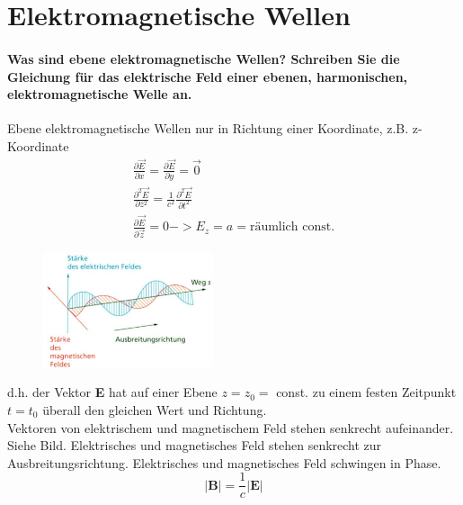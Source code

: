 \documentclass[a4paper, 11pt, parskip=half]{scrartcl}
\begin{document}
\newpage

\section{Elektromagnetische Wellen}

\paragraph{Was sind ebene elektromagnetische Wellen? Schreiben Sie die Gleichung für das elektrische
Feld einer ebenen, harmonischen, elektromagnetische Welle an.} 
Ebene elektromagnetische Wellen nur in Richtung einer Koordinate, z.B. z- Koordinate
\begin{equation}
\begin{split}
\frac{\partial \vec{E}}{\partial x} = \frac{\partial \vec{E}}{\partial y} = \vec{0} \\
\frac{\partial^2 \vec{E}}{\partial z^2} = \frac{1}{c^2} \frac{\partial^2 \vec{E}}{\partial t^2} \\
\frac{\partial \vec{E}}{\partial \vec{z}} = 0 -> E_z = a = \text{räumlich const.}
\end{split}
\end{equation}
\begin{figure}[H]
    \centering
    \includegraphics[width=5cm]{image/13/1.png}
\end{figure}
d.h. der Vektor \textbf{E} hat auf einer Ebene $z = z_0 =$ const. zu einem festen Zeitpunkt $t = t_0$ überall den gleichen Wert und Richtung. \\
Vektoren von elektrischem und magnetischem Feld stehen senkrecht aufeinander. Siehe Bild. Elektrisches und magnetisches Feld stehen senkrecht zur Ausbreitungsrichtung. Elektrisches und magnetisches Feld schwingen in Phase.
\begin{equation}
|\textbf{B}| = \frac{1}{c} |\textbf{E}|
\end{equation}
\end{document}
